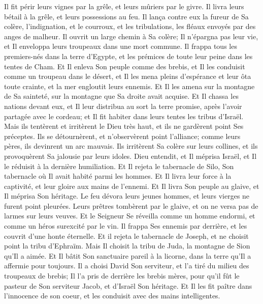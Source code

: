 {\VERSE Il fit périr leurs vignes par la grêle, et leurs mûriers par le givre. \EVERSE
\VERSE Il livra leurs bétail à la grêle, et leurs possessions au feu. \EVERSE
\VERSE Il lança contre eux la fureur de Sa colère, l'indignation, et le courroux, et les tribulations, les fléaux envoyés par des anges de malheur. \EVERSE
\VERSE Il ouvrit un large chemin à Sa colère; Il n'épargna pas leur vie, et Il enveloppa leurs troupeaux dans une mort commune. \EVERSE
\VERSE Il frappa tous les premiers-nés dans la terre d'Egypte, et les prémices de toute leur peine dans les tentes de Cham. \EVERSE
\VERSE Et Il enleva Son peuple comme des brebis, et Il les conduisit comme un troupeau dans le désert, \EVERSE
\VERSE et Il les mena pleins d'espérance et leur ôta toute crainte, et la mer engloutit leurs ennemis. \EVERSE
\VERSE Et Il les amena sur la montagne de Sa sainteté, sur la montagne que Sa droite avait acquise. Et Il chassa les nations devant eux, et Il leur distribua au sort la terre promise, après l'avoir partagée avec le cordeau; \EVERSE
\VERSE et Il fit habiter dans leurs tentes les tribus d'Israël. \EVERSE
\VERSE Mais ils tentèrent et irritèrent le Dieu très haut, et ils ne gardèrent point Ses préceptes. \EVERSE
\VERSE Ils se détournèrent, et n'observèrent point l'alliance; comme leurs pères, ils devinrent un arc mauvais. \EVERSE
\VERSE Ils irritèrent Sa colère sur leurs collines, et ils provoquèrent Sa jalousie par leurs idoles. \EVERSE
\VERSE Dieu entendit, et Il méprisa Israël, et Il le réduisit à la dernière humiliation. \EVERSE
\VERSE Et Il rejeta le tabernacle de Silo, Son tabernacle où Il avait habité parmi les hommes. \EVERSE
\VERSE Et Il livra leur force à la captivité, et leur gloire aux mains de l'ennemi. \EVERSE
\VERSE Et Il livra Son peuple au glaive, et Il méprisa Son héritage. \EVERSE
\VERSE Le feu dévora leurs jeunes hommes, et leurs vierges ne furent point pleurées. \EVERSE
\VERSE Leurs prêtres tombèrent par le glaive, et on ne versa pas de larmes sur leurs veuves. \EVERSE
\VERSE Et le Seigneur Se réveilla comme un homme endormi, et comme un héros surexcité par le vin. \EVERSE
\VERSE Il frappa Ses ennemis par derrière, et les couvrit d'une honte éternelle. \EVERSE
\VERSE Et il rejeta le tabernacle de Joseph, et ne choisit point la tribu d'Ephraïm. \EVERSE
\VERSE Mais Il choisit la tribu de Juda, la montagne de Sion qu'Il a aimée. \EVERSE
\VERSE Et Il bâtit Son sanctuaire pareil à la licorne, dans la terre qu'Il a affermie pour toujours. \EVERSE
\VERSE Il a choisi David Son serviteur, et l'a tiré du milieu des troupeaux de brebis; Il l'a pris de derrière les brebis mères, \EVERSE
\VERSE pour qu'il fût le pasteur de Son serviteur Jacob, et d'Israël Son héritage. \EVERSE
\VERSE Et Il les fit paître dans l'innocence de son coeur, et les conduisit avec des mains intelligentes.

}
